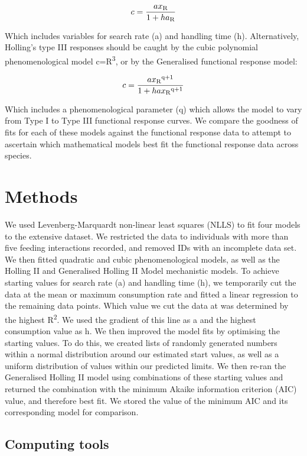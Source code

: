 \documentclass[11pt]{article}
\begin{document}
	$$c=\frac{ax\textsubscript{R}}{1+ha\textsubscript{R}}$$
	
	Which includes variables for search rate (a) and handling time (h). Alternatively, Holling's type III responses should be caught by the cubic polynomial phenomenological model c=R\textsuperscript{3}, or by the Generalised functional response model:

	$$c=\frac{ax\textsubscript{R}\textsuperscript{q+1}}{1 + hax\textsubscript{R}\textsuperscript{q+1}}$$
	
	Which includes a phenomenological parameter (q) which allows the model to vary from Type I to Type III functional response curves. We compare the goodness of fits for each of these models against the functional response data to attempt to ascertain which mathematical models best fit the functional response data across species. 
	
	\section*{Methods}
	
	We used Levenberg-Marquardt non-linear least squares (NLLS) to fit four models to the extensive dataset. We restricted the data to individuals with more than five feeding interactions recorded, and removed IDs with an incomplete data set. We then fitted quadratic and cubic phenomenological models, as well as the Holling II and Generalised Holling II Model mechanistic models. To achieve starting values for search rate (a) and handling time (h), we temporarily cut the data at the mean or maximum consumption rate and fitted a linear regression to the remaining data points. Which value we cut the data at was determined by the highest R\textsuperscript{2}. We used the gradient of this line as a and the highest consumption value as h. We then improved the model fits by optimising the starting values. To do this, we created lists of randomly generated numbers within a normal distribution around our estimated start values, as well as a uniform distribution of values within our predicted limits. We then re-ran the Generalised Holling II model using combinations of these starting values and returned the combination with the minimum Akaike information criterion (AIC) value, and therefore best fit. We stored the value of the minimum AIC and its corresponding model for comparison.\\
	
	\subsection*{Computing tools}
	
\end{document}
